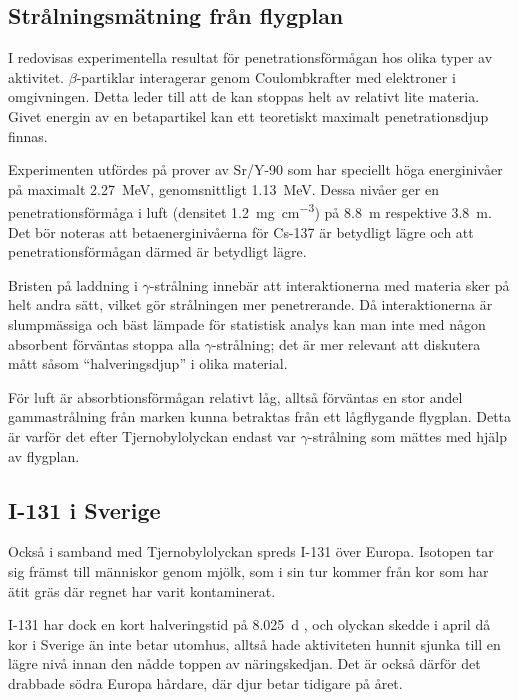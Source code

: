 \subsection{Strålningsmätning från flygplan}

I \textcite{penetration} redovisas experimentella resultat för
penetrationsförmågan hos olika typer av aktivitet. $\beta$-partiklar
interagerar genom Coulombkrafter med elektroner i omgivningen. Detta leder till
att de kan stoppas helt av relativt lite materia. Givet energin av en
betapartikel kan ett teoretiskt maximalt penetrationsdjup finnas.

Experimenten utfördes på prover av Sr/Y-90 som har speciellt höga energinivåer
på maximalt \qty{2.27}{\MeV}, genomsnittligt \qty{1.13}{\MeV}. Dessa nivåer ger
en penetrationsförmåga i luft (densitet \qty{1.2}{\mg\per\cm\cubed}) på
\qty{8.8}{\m} respektive \qty{3.8}{\m}. Det bör noteras att betaenerginivåerna
för Cs-137 är betydligt lägre \parencite{fysika} och att penetrationsförmågan
därmed är betydligt lägre.

Bristen på laddning i $\gamma$-strålning innebär att interaktionerna med
materia sker på helt andra sätt, vilket gör strålningen mer penetrerande. Då
interaktionerna är slumpmässiga och bäst lämpade för statistisk analys kan man
inte med någon absorbent förväntas stoppa alla $\gamma$-strålning; det är mer
relevant att diskutera mått såsom ``halveringsdjup'' i olika material.

För luft är absorbtionsförmågan relativt låg, alltså förväntas en stor andel
gammastrålning från marken kunna betraktas från ett lågflygande flygplan. Detta
är varför det efter Tjernobylolyckan endast var $\gamma$-strålning som mättes
med hjälp av flygplan.

\subsection{I-131 i Sverige}

Också i samband med Tjernobylolyckan spreds I-131 över Europa. Isotopen tar sig
främst till människor genom mjölk, som i sin tur kommer från kor som har ätit
gräs där regnet har varit kontaminerat.

I-131 har dock en kort halveringstid på \qty{8.025}{\day} \parencite{fysika},
och olyckan skedde i april då kor i Sverige än inte betar utomhus, alltså hade
aktiviteten hunnit sjunka till en lägre nivå innan den nådde toppen av
näringskedjan. Det är också därför det drabbade södra Europa hårdare, där djur
betar tidigare på året.

